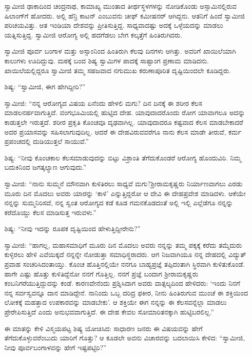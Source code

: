  ಸ್ವಾಮೀಜಿ ಢಾಕಾದಿಂದ ಚಂದ್ರನಾಥ, ಕಾಮಾಖ್ಯ ಮುಂತಾದ ತೀರ್ಥಸ್ಥಳಗಳನ್ನು ನೋಡಿಕೊಂಡು ಅಸ್ಸಾಮಿನಲ್ಲಿರುವ ಷಿಲಾಂಗ್‍ಗೆ ಹೋದರು. ಅಲ್ಲಿ ಹೆನ್ರಿ ಕಾಟನ್ ಎಂಬುವನು ಚೀಫ್ ಕಮೀಷನರ್ ಆಗಿದ್ದನು. ಆತನಿಗೆ ಹಿಂದೆ ಸ್ವಾಮೀಜಿ ಪರಿಚಯವಿತ್ತು. ಆತ ಇಂಡಿಯಾ ದೇಶವನ್ನು ಪ್ರೀತಿಸುತ್ತಿದ್ದ. ಸಾಧ್ಯವಾದಷ್ಟು ಅದಕ್ಕೆ ಒಳ್ಳೆಯದನ್ನು ಮಾಡಲು ಯತ್ನಿಸುತ್ತಿದ್ದ. ಸ್ವಾಮೀಜಿ ಆರೋಗ್ಯ ಅಲ್ಲಿ ಹದಗೆಡಲು ಬೇಗ ಕಲ್ಕತ್ತೆಗೆ ಹಿಂತಿರುಗಿದರು. 

 ಸ್ವಾಮೀಜಿ ಪೂರ್ವ ಬಂಗಾಳ ಮತ್ತು ಅಸ್ಸಾಂನಿಂದ ಹಿಂತಿರುಗಿ ಕೆಲವು ದಿನಗಳು ಆಗಿತ್ತು. ಅವರಿಗೆ ಖಾಯಿಲೆಯಾಗಿ ಕಾಲುಗಳು ಊದಿದ್ದುವು. ಮಠಕ್ಕೆ ಬಂದ ಶಿಷ್ಯ ಸ್ವಾಮಿಗಳ ಪಾದಕ್ಕೆ ಸಾಷ್ಟಾಂಗ ಪ್ರಣಾಮ ಮಾಡಿದನು. ಖಾಯಿಲೆಯಲ್ಲಿದ್ದರೂ ಸ್ವಾಮೀಜಿ ತಮ್ಮ ಸಹಜವಾದ ನಗುಮುಖ ಕರುಣಾಪೂರಿತ ದೃಷ್ಟಿಯಿಂದಲೇ ಕೂಡಿದ್ದರು. 

 ಶಿಷ್ಯ: “ಸ್ವಾಮೀಜಿ, ಈಗ ಹೇಗಿದ್ದೀರಿ?” 

 ಸ್ವಾಮೀಜಿ: “ನನ್ನ ಆರೋಗ್ಯದ ವಿಷಯ ಏನೆಂದು ಹೇಳಲಿ ಮಗು? ದಿನ ದಿನಕ್ಕೆ ಈ ಶರೀರ ಕೆಲಸ ಮಾಡಲನರ್ಹವಾಗುತ್ತಿದೆ. ವಂಗಭೂಮಿಯಲ್ಲಿ ಹುಟ್ಟಿದ ದೇಹ. ಯಾವುದಾದರೊಂದು ರೋಗ ಯಾವಾಗಲೂ ಅದನ್ನು ಕಾಡುತ್ತಲೇ ಇರುತ್ತದೆ. ಶರೀರ ಪ್ರಕೃತಿ ಕೊಂಚವೂ ದೃಢವಾಗಿಲ್ಲ. ಯಾವುದಾದರೂ ಕಷ್ಟವಾದ ಕೆಲಸ ಮಾಡಬೇಕಾದರೆ ಅದರ ಪ್ರಯಾಸವನ್ನು ಸಹಿಸಲಾಗುವುದಿಲ್ಲ. ಆದರೆ ಈ ದೇಹವಿರುವವರೆಗೂ ನಾನು ಕೆಲಸ ಮಾಡೇ ತೀರುವೆ, ಕರ್ಮ ಪ್ರಪಂಚದಲ್ಲಿ ದುಡಿಯುತ್ತಲೆ ಸಾಯುವೆ.” 

 ಶಿಷ್ಯ: “ನೀವು ಕೊಂಚಕಾಲ ಕೆಲಸಮಾಡುವುದನ್ನು ಬಿಟ್ಟು ವಿಶ್ರಾಂತಿ ತೆಗೆದುಕೊಂಡರೆ ಆರೋಗ್ಯ ಹೊಂದುವಿರಿ. ನಿಮ್ಮ ಬದುಕಿನಿಂದ ಜಗತ್ಕಲ್ಯಾಣ ಆಗುವುದು.” 

 ಸ್ವಾಮೀಜಿ: “ನಾನು ಸುಮ್ಮನೆ ಮೌನವಾಗಿ ಕುಳಿತಿರಲು ಸಾಧ್ಯವೆ ಮಗು?\break ಶ‍್ರೀರಾಮಕೃಷ್ಣರು ನಿರ್ಯಾಣವಾಗಲು ಎರಡು ಮೂರು ದಿನ ಮೊದಲು ಅವರು ಯಾರನ್ನು ‘ಕಾಳಿ’ ಎನ್ನುತ್ತಿದ್ದರೋ ಆ ದೇವಿ ಈ ದೇಹಪ್ರವೇಶ ಮಾಡಿದಳು. ಆಕೆಯೇ ನನ್ನನ್ನು ಸುಮ್ಮನಿರಿಸದೆ, ನನ್ನ ಸ್ವಂತ ಆರೋಗ್ಯದ ಕಡೆ ಕೂಡ ಗಮನಕೊಡದಂತೆ ಅಲ್ಲಿ ಇಲ್ಲಿ ಎಲ್ಲೆಡೆಗೂ ನನ್ನನ್ನು ಕರೆದೊಯ್ದು ಕೆಲಸ ಮಾಡಿಸುತ್ತ ಇರುವಳು.” 

 ಶಿಷ್ಯ: “ನೀವು ಇದನ್ನು ರೂಪಕ ದೃಷ್ಟಿಯಿಂದ ಹೇಳುತ್ತಿದ್ದೀರೇನು?” 

 ಸ್ವಾಮೀಜಿ: “ಹಾಗಲ್ಲ, ಮಹಾಸಮಾಧಿಗೆ ಮೂರು ದಿನ ಮೊದಲು ಅವರು ನನ್ನನ್ನು ತಮ್ಮ ಪಕ್ಕಕ್ಕೆ ಕರೆದು ತಮ್ಮೆದುರು ಕುಳ್ಳಿರಲು ಹೇಳಿ ಎವೆಯಿಕ್ಕದೆ ನನ್ನನ್ನೇ ನೋಡುತ್ತಾ ಸಮಾಧಿಸ್ಥರಾದರು. ಆಗ ನಿಜವಾಗಿಯೂ ನನ್ನ ದೇಹದಲ್ಲಿ ವಿದ್ಯುತ್ ಪ್ರವಾಹ ಸಂಚರಿಸಿದಂತಾಯ್ತು. ಕೊಂಚ ಹೊತ್ತಿನಲ್ಲಿಯೇ ನನಗೂ ಬಾಹ್ಯಪ್ರಜ್ಞೆ ತಪ್ಪಿದಂತಾಗಿ ಸ್ಥಿರವಾಗಿ ಕುಳಿತುಕೊಂಡೆ. ಹಾಗೇ ಎಷ್ಟು ಹೊತ್ತು ಕುಳಿತಿದ್ದೆನೋ ನನಗೆ ಗೊತ್ತಿಲ್ಲ. ನನಗೆ ಪ್ರಜ್ಞೆ ಬಂದಾಗ ಶ‍್ರೀರಾಮಕೃಷ್ಣರು ಕಂಬನಿಗರೆಯುತ್ತಿದ್ದುದನ್ನು ಕಂಡೆ. ಕಾರಣವೇನೆಂದು ಪ್ರಶ್ನಿಸಿದಾಗ ಅವರು ವಾತ್ಸಲ್ಯದಿಂದ ಹೇಳಿದರು: ‘ಇಂದು ನಿನಗೆ ನನ್ನ ಸರ್ವಸ್ವವನ್ನೂ ದಾನ ಮಾಡಿದ್ದೇನೆ. ನಾನಿಂದು ಒಬ್ಬ ದರಿದ್ರ ಫಕೀರ, ನೀನು ಹಿಂತಿರುಗುವ ಮುಂಚೆ ಈ ಶಕ್ತಿಯಿಂದ ಲೋಕಕ್ಕೆ ಮಹತ್ತಾದ ಉಪಕಾರವನ್ನು ಮಾಡಬೇಕು’. ಆ ಶಕ್ತಿಯೇ ಈಗ ನನ್ನನ್ನು ಈ ಕೆಲಸವನ್ನೆಲ್ಲಾ ಮಾಡಲು ಪ್ರೇರೇಪಿಸುತ್ತಿದೆ ಎಂದು ಅನುಭವವಾಗುತ್ತಿದೆ. ಈ ದೇಹ ಕೇವಲ ಸೋಮಾರಿತನಕ್ಕಾಗಿ ಹುಟ್ಟಿಬರಲಿಲ್ಲ.” 

\vskip 2pt

 ಈ ಮಾತನ್ನು ಕೇಳಿ ವಿಸ್ಮಯಪಟ್ಟ ಶಿಷ್ಯ ಯೋಚಿಸಿದ: ಸಾಧಾರಣ ಜನರು ಈ ವಿಷಯವನ್ನು ಹೇಗೆ ತೆಗೆದುಕೊಳ್ಳುವರೆಂಬುದು ಯಾರಿಗೆ ಗೊತ್ತು? ಆ ಕೂಡಲೇ ಅವನು ವಿಚಾರವನ್ನು ಬದಲಾಯಿಸಿ ಕೇಳಿದ: “ಸ್ವಾಮೀಜಿ, ನೀವು ಪೂರ್ವಬಂಗಾಳವನ್ನು ಹೇಗೆ ಇಷ್ಟಪಟ್ಟಿರಿ?” 

